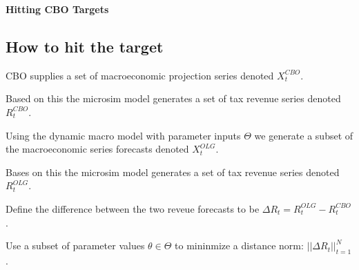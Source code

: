 \documentclass[letterpaper,12pt]{article}
\begin{document}
\begin{center}
{\LARGE \bf Hitting CBO Targets}
\end{center}

\begin{spacing}{1.5}

\section{How to hit the target}

	CBO supplies a set of macroeconomic projection series denoted $X_t^{CBO}$.

	Based on this the microsim model generates a set of tax revenue series denoted $R_t^{CBO}$.

	Using the dynamic macro model with parameter inputs $\Theta$ we generate a subset of the macroeconomic series forecasts denoted $X_t^{OLG}$.

	Bases on this the microsim model generates a set of tax revenue series denoted $R_t^{OLG}$.

	Define the difference between the two reveue forecasts to be $\Delta R_t = R_t^{OLG}-R_t^{CBO}$.

	Use a subset of parameter values $\theta \in \Theta$ to mininmize a distance norm: $|| \Delta R_t ||_{t=1}^N$.

\end{spacing}
\end{document}
